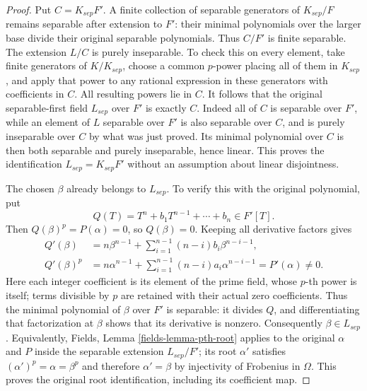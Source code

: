 \begin{proof}
Put $C=K_{sep}F'$. A finite collection of separable
generators of $K_{sep}/F$ remains separable after
extension to $F'$: their minimal polynomials over
the larger base divide their original separable
polynomials. Thus $C/F'$ is finite separable.
The extension $L/C$ is purely inseparable. To
check this on every element, take finite
generators of $K/K_{sep}$, choose a common
$p$-power placing all of them in $K_{sep}$,
and apply that power to any rational expression
in these generators with coefficients in $C$.
All resulting powers lie in $C$.
It follows that the original separable-first
field $L_{sep}$ over $F'$ is exactly $C$.
Indeed all of $C$ is separable over $F'$, while
an element of $L$ separable over $F'$ is also
separable over $C$, and is purely inseparable
over $C$ by what was just proved. Its minimal
polynomial over $C$ is then both separable and
purely inseparable, hence linear. This proves
the identification $L_{sep}=K_{sep}F'$ without
an assumption about linear disjointness.

The chosen $\beta$ already belongs to $L_{sep}$.
To verify this with the original polynomial, put
$$
Q(T)=T^n+b_1T^{n-1}+\cdots+b_n\in F'[T].
$$
Then $Q(\beta)^p=P(\alpha)=0$, so
$Q(\beta)=0$. Keeping all derivative factors gives
\[
\begin{split}
Q'(\beta)&=n\beta^{n-1}
+\sum_{i=1}^{n-1}(n-i)b_i\beta^{n-i-1},\\
Q'(\beta)^p&=n\alpha^{n-1}
+\sum_{i=1}^{n-1}(n-i)a_i\alpha^{n-i-1}
=P'(\alpha)\ne0.
\end{split}
\]
Here each integer coefficient is its element of
the prime field, whose $p$-th power is itself;
terms divisible by $p$ are retained with their
actual zero coefficients. Thus the minimal
polynomial of $\beta$ over $F'$ is separable:
it divides $Q$, and differentiating that
factorization at $\beta$ shows that its
derivative is nonzero. Consequently
$\beta\in L_{sep}$. Equivalently, Fields,
Lemma \ref{fields-lemma-pth-root} applies to
the original $\alpha$ and $P$ inside the separable
extension $L_{sep}/F'$; its root $\alpha'$
satisfies $(\alpha')^p=\alpha=\beta^p$ and
therefore $\alpha'=\beta$ by injectivity of
Frobenius in $\Omega$. This proves the original
root identification, including its coefficient map.


\end{proof}
